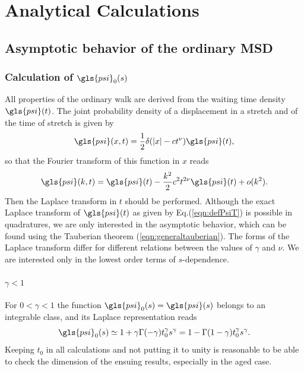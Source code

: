 \chapter{Analytical Calculations}

\section{Asymptotic behavior of the ordinary MSD}

\subsection*{Calculation of $\gls{psi}_0(s)$}
All properties of the ordinary walk are derived from the waiting time density $\gls{psi}(t)$. The joint probability density of a displacement in a stretch and of the time of stretch is given by
%
\begin{equation}
 \gls{psi}(x,t) = \frac{1}{2} \delta(|x| - ct^\nu ) \gls{psi}(t),
\end{equation}
%
so that the Fourier transform of this function in $x$ reads
\begin{equation}
 \gls{psi}(k,t) = \gls{psi}(t) - \frac{k^2}{2} c^2 t^{2 \nu} \gls{psi}(t) + o(k^2). 
\end{equation}
Then the Laplace transform in $t$ should be performed.  Although the exact Laplace transform of $\gls{psi}(t)$ as given by Eq.(\ref{eqn:defPsiT}) is possible in quadratures, we are only interested in the asymptotic behavior, which can be found using the Tauberian theorem (\ref{eqn:generaltauberian}). The forms of the Laplace transform 
differ for different relations between the values of $\gamma$ and $\nu$. We are interested only in the lowest order terms
of $s$-dependence. 

\subsubsection*{$ \gamma<1$}
For $0<\gamma <1$ the function $ \gls{psi}_0(s) = \gls{psi}(s)$ belongs to an integrable class, and its Laplace representation reads
\begin{equation}
 \gls{psi}_0(s) \simeq 1 + \gamma \Gamma(-\gamma) t_0^\gamma s^\gamma 
 = 1-\Gamma(1-\gamma) t_0^\gamma s^\gamma. \label{eqn:psi0GammaSmall}
\end{equation}
Keeping $t_0$ in all calculations and not putting it to unity is reasonable to be able to check the dimension of the ensuing results, especially in the aged case. 

